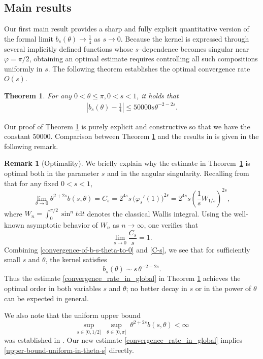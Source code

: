\documentclass[reqno,10pt]{amsart}
\def\th{\theta}
\newcommand{\ben}{\begin{eqnarray}}
\newcommand{\een}{\end{eqnarray}}
\newtheorem{thm}{Theorem}[section]
\theoremstyle{definition}
\newtheorem{rmk}{Remark}[section]
\numberwithin{equation}{section}
\begin{document}
\subsection{Main results}
Our first main result provides a sharp and fully explicit quantitative version of the formal limit $b_s(\theta)\to\frac14$ as $s\to0$. 
Because the kernel is expressed through several implicitly defined functions whose $s$–dependence becomes singular near $\varphi=\pi/2$, obtaining an optimal estimate requires controlling all such compositions uniformly in $s$. 
The following theorem establishes the optimal convergence rate $O(s)$.

\begin{thm}\label{kernel-convergence}  For any  $0<\theta \leq  \pi, 0<s<1$, it holds that
	\ben\label{convergence_rate_in_global}
	\left|b_s(\th)-\frac{1}{4}\right|\leq 50000s\th^{-2-2 s}.
	\een
\end{thm}

Our proof of Theorem \ref{kernel-convergence} is purely explicit and constructive so that we have the constant $50000$.
Comparison between Theorem \ref{kernel-convergence} and the results in  \cite{Jang2023-df} is given in the following remark.
\begin{rmk}
[Optimality]\label{optimality}
We briefly explain why the estimate in Theorem~\ref{kernel-convergence} is optimal
both in the parameter $s$ and in the angular singularity.
Recalling from \cite[Theorem~1(ii)]{Jang2023-df} that for any fixed $0<s<1$,
\begin{equation}\label{convergence-of-b-s-theta-to-0}
    \lim_{\theta \to 0} \theta^{2+2s} b(s,\theta)
    = C_s 
    = 2^{4s}s \, \bigl(\varphi_s'(1)\bigr)^{2s}
    = 2^{4s}s \left(\frac{1}{s} W_{1/s}\right)^{2s},
\end{equation}
where $W_n=\int_0^{\pi/2} \sin^{n} t \mathrm{d}t$ denotes the classical Wallis integral.
Using the well-known asymptotic behavior of $W_n$ as $n\to\infty$, one verifies that
\begin{equation}\label{C-s}
    \lim_{s\to0} \frac{C_s}{s} = 1.
\end{equation}
Combining \eqref{convergence-of-b-s-theta-to-0} and \eqref{C-s}, we see that for sufficiently
small $s$ and $\theta$, the kernel satisfies
\[
    b_s(\theta)\sim s\,\theta^{-2-2s}.
\]
Thus the estimate \eqref{convergence_rate_in_global} in Theorem \ref{kernel-convergence}
achieves the optimal order in both variables $s$ and $\theta$; no better decay in $s$
or in the power of $\theta$ can be expected in general.

We also note that the uniform upper bound
\begin{equation}\label{upper-bound-uniform-in-theta-s}
    \sup_{s\in(0,1/2]}\;\sup_{\theta\in(0,\pi]}\;
    \theta^{2+2s} b(s,\theta) < \infty
\end{equation}
was established in \cite[Theorem~1(iii)]{Jang2023-df}.  
Our new estimate \eqref{convergence_rate_in_global} implies \eqref{upper-bound-uniform-in-theta-s} directly.
\end{rmk}
\end{document}
